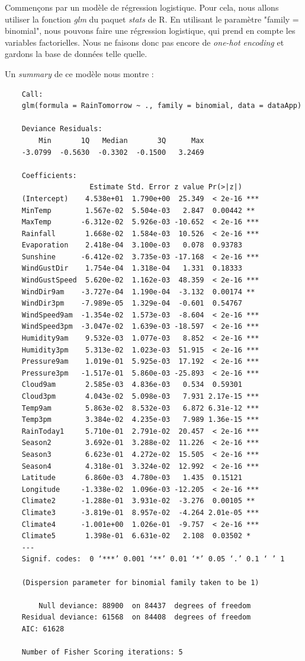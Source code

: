 \documentclass{article}
\begin{document}
Commençons par un modèle de régression logistique. Pour cela, nous allons utiliser la fonction \emph{glm} du paquet \emph{stats} de R. En utilisant le paramètre "family = binomial", nous pouvons faire une régression logistique, qui prend en compte les variables factorielles. Nous ne faisons donc pas encore de \emph{one-hot encoding} et gardons la base de données telle quelle. 

Un \emph{summary} de ce modèle nous montre : 
\begin{verbatim}
    Call:
    glm(formula = RainTomorrow ~ ., family = binomial, data = dataApp)
    
    Deviance Residuals: 
        Min       1Q   Median       3Q      Max  
    -3.0799  -0.5630  -0.3302  -0.1500   3.2469  
    
    Coefficients:
                    Estimate Std. Error z value Pr(>|z|)    
    (Intercept)    4.538e+01  1.790e+00  25.349  < 2e-16 ***
    MinTemp        1.567e-02  5.504e-03   2.847  0.00442 ** 
    MaxTemp       -6.312e-02  5.926e-03 -10.652  < 2e-16 ***
    Rainfall       1.668e-02  1.584e-03  10.526  < 2e-16 ***
    Evaporation    2.418e-04  3.100e-03   0.078  0.93783    
    Sunshine      -6.412e-02  3.735e-03 -17.168  < 2e-16 ***
    WindGustDir    1.754e-04  1.318e-04   1.331  0.18333    
    WindGustSpeed  5.620e-02  1.162e-03  48.359  < 2e-16 ***
    WindDir9am    -3.727e-04  1.190e-04  -3.132  0.00174 ** 
    WindDir3pm    -7.989e-05  1.329e-04  -0.601  0.54767    
    WindSpeed9am  -1.354e-02  1.573e-03  -8.604  < 2e-16 ***
    WindSpeed3pm  -3.047e-02  1.639e-03 -18.597  < 2e-16 ***
    Humidity9am    9.532e-03  1.077e-03   8.852  < 2e-16 ***
    Humidity3pm    5.313e-02  1.023e-03  51.915  < 2e-16 ***
    Pressure9am    1.019e-01  5.925e-03  17.192  < 2e-16 ***
    Pressure3pm   -1.517e-01  5.860e-03 -25.893  < 2e-16 ***
    Cloud9am       2.585e-03  4.836e-03   0.534  0.59301    
    Cloud3pm       4.043e-02  5.098e-03   7.931 2.17e-15 ***
    Temp9am        5.863e-02  8.532e-03   6.872 6.31e-12 ***
    Temp3pm        3.384e-02  4.235e-03   7.989 1.36e-15 ***
    RainToday1     5.710e-01  2.791e-02  20.457  < 2e-16 ***
    Season2        3.692e-01  3.288e-02  11.226  < 2e-16 ***
    Season3        6.623e-01  4.272e-02  15.505  < 2e-16 ***
    Season4        4.318e-01  3.324e-02  12.992  < 2e-16 ***
    Latitude       6.860e-03  4.780e-03   1.435  0.15121    
    Longitude     -1.338e-02  1.096e-03 -12.205  < 2e-16 ***
    Climate2      -1.288e-01  3.931e-02  -3.276  0.00105 ** 
    Climate3      -3.819e-01  8.957e-02  -4.264 2.01e-05 ***
    Climate4      -1.001e+00  1.026e-01  -9.757  < 2e-16 ***
    Climate5       1.398e-01  6.631e-02   2.108  0.03502 *  
    ---
    Signif. codes:  0 ‘***’ 0.001 ‘**’ 0.01 ‘*’ 0.05 ‘.’ 0.1 ‘ ’ 1
    
    (Dispersion parameter for binomial family taken to be 1)
    
        Null deviance: 88900  on 84437  degrees of freedom
    Residual deviance: 61568  on 84408  degrees of freedom
    AIC: 61628
    
    Number of Fisher Scoring iterations: 5
\end{verbatim}
\end{document}
